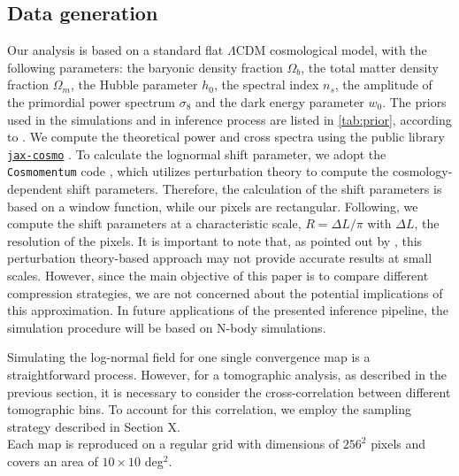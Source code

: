 \documentclass{aa}
\begin{document}
\subsection{Data generation}
Our analysis is based on a standard flat $\Lambda$CDM cosmological model, with the following parameters: the baryonic density fraction $\Omega_b$, the total matter density fraction $\Omega_m$, the Hubble parameter $h_0$, the spectral index $n_s$, the amplitude of the primordial power spectrum $\sigma_8$ and the dark energy parameter $w_0$. The priors used in the simulations and in inference process are listed in \autoref{tab:prior}, according to \citet{zhang2022transitioning}.
We compute the theoretical power and cross spectra using the public library \href{https://github.com/DifferentiableUniverseInitiative/jax_cosmo}{\texttt{jax-cosmo}} \citep{Campagne_2023}. To calculate the 
lognormal shift parameter, we adopt the \texttt{Cosmomentum} code \citep{friedrich2018density, friedrich2020primordial}, which utilizes perturbation theory to compute the cosmology-dependent shift parameters. Therefore, the calculation of the shift parameters is based on a window function, while our pixels are rectangular. Following, we compute the shift parameters at a characteristic scale, $R=\Delta L/\pi$  with $\Delta L$, the resolution of the pixels.  It is important to note that, as pointed out by \citet{boruah2022map}, this perturbation theory-based approach may not provide accurate results at small scales. However, since the main objective of this paper is to compare different compression strategies, we are not concerned about the potential implications of this approximation. In future applications of the presented inference pipeline, the simulation procedure will be based on N-body simulations.


Simulating the log-normal field for one single convergence map is a straightforward process. 
However, for a tomographic analysis, as described in the previous section, it is necessary to consider the cross-correlation between different tomographic bins. To account for this correlation, we employ the sampling strategy described in Section X. \\
Each map is reproduced on a regular grid with dimensions of $256^2$ pixels and covers an area of $10\times 10$ deg$^2$.
\end{document}

